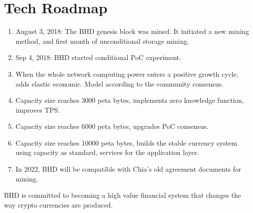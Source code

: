 \chapter{Tech Roadmap}
\begin{enumerate}
    \item August 3, 2018: The BHD genesis block was mined. It initiated a new mining method, and first month of unconditional storage mining.
    \item Sep 4, 2018: BHD started conditional PoC experiment.
    \item When the whole network computing power enters a positive growth cycle, adds elastic economic. Model according to the community consensus.
    \item Capacity size reaches 3000 peta bytes, implements zero knowledge function, improves TPS.
    \item Capacity size reaches 6000 peta bytes, upgrades PoC consensus.
    \item Capacity size reaches 10000 peta bytes, builds the stable currency system using capacity as standard, services for the application layer.
    \item In 2022, BHD will be compatible with Chia's old agreement documents for mining.
\end{enumerate}
\begin{flushleft}
    BHD is committed to becoming a high value financial system that changes the way crypto currencies are produced.
\end{flushleft}

